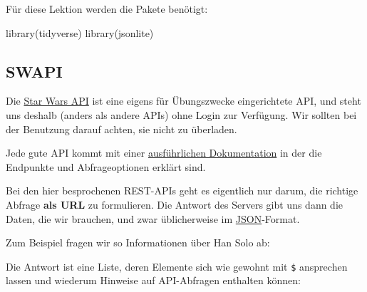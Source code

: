 \documentclass[
  ngerman,
]{article}
\newenvironment{Shaded}{\begin{snugshade}}{\end{snugshade}}
\newcommand{\DocumentationTok}[1]{\textcolor[rgb]{0.56,0.35,0.01}{\textbf{\textit{#1}}}}
\newcommand{\FunctionTok}[1]{\textcolor[rgb]{0.00,0.00,0.00}{#1}}
\newcommand{\NormalTok}[1]{#1}
\newcommand{\OtherTok}[1]{\textcolor[rgb]{0.56,0.35,0.01}{#1}}
\newcommand{\SpecialCharTok}[1]{\textcolor[rgb]{0.00,0.00,0.00}{#1}}
\newcommand{\StringTok}[1]{\textcolor[rgb]{0.31,0.60,0.02}{#1}}
\begin{document}
Für diese Lektion werden die Pakete benötigt:

\begin{Shaded}
\begin{Highlighting}[]
\FunctionTok{library}\NormalTok{(tidyverse)}
\FunctionTok{library}\NormalTok{(jsonlite)}
\end{Highlighting}
\end{Shaded}

\hypertarget{swapi}{%
\subsection{SWAPI}\label{swapi}}

Die \href{https://www.swapi.tech/}{Star Wars API} ist eine eigens für Übungszwecke eingerichtete API, und steht uns deshalb (anders als andere APIs) ohne Login zur Verfügung. Wir sollten bei der Benutzung darauf achten, sie nicht zu überladen.

Jede gute API kommt mit einer \href{https://www.swapi.tech/documentation}{ausführlichen Dokumentation} in der die Endpunkte und Abfrageoptionen erklärt sind.

Bei den hier besprochenen REST-APIs geht es eigentlich nur darum, die richtige Abfrage \textbf{als URL} zu formulieren. Die Antwort des Servers gibt uns dann die Daten, die wir brauchen, und zwar üblicherweise im \href{https://de.wikipedia.org/wiki/JavaScript_Object_Notation}{JSON}-Format.

Zum Beispiel fragen wir so Informationen über Han Solo ab:

\begin{Shaded}
\end{Shaded}

Die Antwort ist eine Liste, deren Elemente sich wie gewohnt mit \texttt{\$} ansprechen lassen und wiederum Hinweise auf API-Abfragen enthalten können:

\begin{Shaded}
\end{Shaded}
\end{document}
